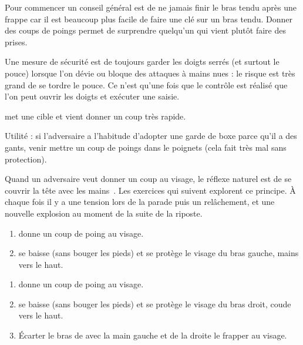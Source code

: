 Pour commencer un conseil général est de ne jamais finir le bras tendu après une frappe car il est beaucoup plus facile de faire une clé sur un bras tendu.
Donner des coups de poings permet de surprendre quelqu'un qui vient plutôt faire des prises.

Une mesure de sécurité est de toujours garder les doigts serrés (et surtout le pouce) lorsque l'on dévie ou bloque des attaques à mains nues : le risque est très grand de se tordre le pouce.
Ce n'est qu'une fois que le contrôle est réalisé que l'on peut ouvrir les doigts et exécuter une saisie.


\begin{exercice}

\A met une cible et \D vient donner un coup très rapide.

Utilité : si l'adversaire a l'habitude d'adopter une garde de boxe parce qu'il a des gants, venir mettre un coup de poings dans le poignets (cela fait très mal sans protection).

\end{exercice}


Quand un adversaire veut donner un coup au visage, le réflexe naturel est de se couvrir la tête avec les mains~\cite{enzi:dijon:messer_inner:2015}.
Les exercices qui suivent explorent ce principe.
À chaque fois il y a une tension lors de la parade puis un relâchement, et une nouvelle explosion au moment de la suite de la riposte.


\begin{exercice}
\label{mains-nues:ex:enzi-1}

\begin{enumerate}
	\item \A donne un coup de poing au visage.
	\item \D se baisse (sans bouger les pieds) et se protège le visage du bras gauche, mains vers le haut.
\end{enumerate}

\end{exercice}


\begin{exercice}
\label{mains-nues:ex:enzi-2}

\begin{enumerate}
	\item \A donne un coup de poing au visage.
	\item \D se baisse (sans bouger les pieds) et se protège le visage du bras droit, coude vers le haut.
	\item Écarter le bras de \A avec la main gauche et de la droite le frapper au visage.
\end{enumerate}

\end{exercice}


